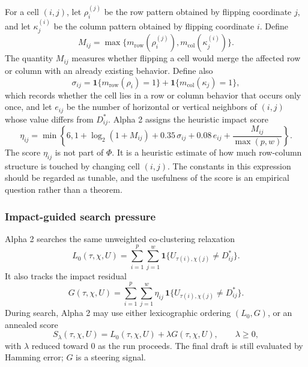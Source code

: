 \documentclass[11pt]{article}
\begin{document}
For a cell \((i,j)\), let \(\rho_i^{(j)}\) be the row pattern obtained by
flipping coordinate \(j\), and let \(\kappa_j^{(i)}\) be the column pattern
obtained by flipping coordinate \(i\). Define
\[
  M_{ij}
  =
  \max\{
    m_{\mathrm{row}}(\rho_i^{(j)}),
    m_{\mathrm{col}}(\kappa_j^{(i)})
  \}.
\]
The quantity \(M_{ij}\) measures whether flipping a cell would merge the
affected row or column with an already existing behavior. Define also
\[
  \sigma_{ij}
  =
  \mathbf{1}\{m_{\mathrm{row}}(\rho_i)=1\}
  +
  \mathbf{1}\{m_{\mathrm{col}}(\kappa_j)=1\},
\]
which records whether the cell lies in a row or column behavior that occurs
only once, and let \(e_{ij}\) be the number of horizontal or vertical neighbors
of \((i,j)\) whose value differs from \(D^\ast_{ij}\). Alpha 2 assigns the
heuristic impact score
\[
  \eta_{ij}
  =
  \min\left\{
    6,
    1
    +
    \log_2(1+M_{ij})
    +
    0.35\,\sigma_{ij}
    +
    0.08\,e_{ij}
    +
    \frac{M_{ij}}{\max(p,w)}
  \right\}.
\]
The score \(\eta_{ij}\) is not part of \(\Phi\). It is a heuristic estimate of
how much row-column structure is touched by changing cell \((i,j)\). The
constants in this expression should be regarded as tunable, and the usefulness
of the score is an empirical question rather than a theorem.

\subsubsection*{Impact-guided search pressure}

Alpha 2 searches the same unweighted co-clustering relaxation
\[
  L_0(\tau,\chi,U)
  =
  \sum_{i=1}^{p}\sum_{j=1}^{w}
  \mathbf{1}\{U_{\tau(i),\chi(j)}\ne D^\ast_{ij}\}.
\]
It also tracks the impact residual
\[
  G(\tau,\chi,U)
  =
  \sum_{i=1}^{p}
  \sum_{j=1}^{w}
  \eta_{ij}\,
  \mathbf{1}\{U_{\tau(i),\chi(j)}\ne D^\ast_{ij}\}.
\]
During search, Alpha 2 may use either lexicographic ordering
\((L_0,G)\), or an annealed score
\[
  S_\lambda(\tau,\chi,U)
  =
  L_0(\tau,\chi,U)+\lambda G(\tau,\chi,U),
  \qquad
  \lambda\ge 0,
\]
with \(\lambda\) reduced toward \(0\) as the run proceeds. The final draft is
still evaluated by Hamming error; \(G\) is a steering signal.
\end{document}
